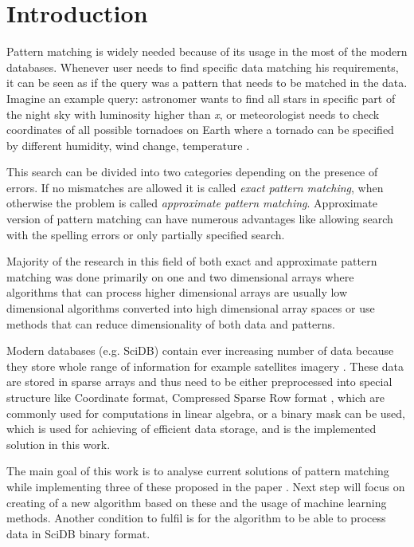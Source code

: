 
\chapter{Introduction}
Pattern matching is widely needed because of its usage in the most of the modern databases. Whenever user needs to find specific data matching his requirements, it can be seen as if the query was a pattern that needs to be matched in the data. Imagine an example query: astronomer wants to find all stars in specific part of the night sky with luminosity higher than \textit{x}, or meteorologist needs to check coordinates of all possible tornadoes on Earth where a tornado can be specified by different humidity, wind change, temperature \cite{detectRivers}.

This search can be divided into two categories depending on the presence of errors. If no mismatches are allowed it is called \textit{exact pattern matching}, when otherwise the problem is called \textit{approximate pattern matching}. Approximate version of pattern matching can have numerous advantages like allowing search with the spelling errors or only partially specified search. 

Majority of the research in this field of both exact and approximate pattern matching was done primarily on one and two dimensional arrays where algorithms that can process higher dimensional arrays are usually low dimensional algorithms converted into high dimensional array spaces or use methods that can reduce dimensionality of both data and patterns.

Modern databases (e.g. SciDB) contain ever increasing number of data because they store whole range of information for example satellites imagery \cite{scidbarch}. These data are stored in sparse arrays and thus need to be either preprocessed into special structure like Coordinate format, Compressed Sparse Row format \cite{saad1990sparskit}, which are commonly used for computations in linear algebra, or a binary mask can be used, which is used for achieving of efficient data storage, and is the implemented solution in this work.

The main goal of this work is to analyse current solutions of pattern matching while implementing three of these proposed in the paper \cite{mdApproxPM}. Next step will focus on creating of a new algorithm based on these and the usage of machine learning methods. Another condition to fulfil is for the algorithm to be able to process data in SciDB binary format. 

